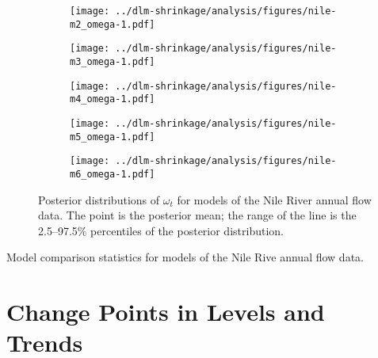 \begin{figure}[htpb!]
  \centering
  \begin{subfigure}[b]{0.5\linewidth}
    \texttt{[image: ../dlm-shrinkage/analysis/figures/nile-m2\_omega-1.pdf]}    
    \caption{}
  \end{subfigure}%
  \begin{subfigure}[b]{0.5\linewidth}
    \texttt{[image: ../dlm-shrinkage/analysis/figures/nile-m3\_omega-1.pdf]}
    \caption{}
  \end{subfigure}
  \begin{subfigure}[b]{0.5\linewidth}
    \texttt{[image: ../dlm-shrinkage/analysis/figures/nile-m4\_omega-1.pdf]}    
    \caption{}
  \end{subfigure}%
  \begin{subfigure}[b]{0.5\linewidth}
    \texttt{[image: ../dlm-shrinkage/analysis/figures/nile-m5\_omega-1.pdf]}
    \caption{}
  \end{subfigure}
  \begin{subfigure}[b]{0.5\linewidth}
    \texttt{[image: ../dlm-shrinkage/analysis/figures/nile-m6\_omega-1.pdf]}    
    \caption{}
  \end{subfigure}
  \caption[Posterior distributions of $\omega_t$ for models of the Nile River annual flow data]{Posterior distributions of $\omega_t$ for models of the Nile River annual flow data. The point is the posterior mean; the range of the line is the 2.5--97.5\% percentiles of the posterior distribution.}
  \label{dlm:fig:nile_omega_posterior}
\end{figure}



\begin{table}[thbp]
  \centering
  
  \caption{Model comparison statistics for models of the Nile Rive annual flow data.}
  \label{dlm:tab:nile-model_comp}
\end{table}


\section{Change Points in Levels and Trends}
\label{dlm:sec:linear-filtering}


